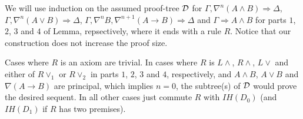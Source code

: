 We will use induction on the assumed proof-tree $\mathcal{D}$ for $\Gamma, \nabla^n (A \wedge B) \Rightarrow \Delta$, $\Gamma, \nabla^n (A \vee B) \Rightarrow \Delta$, $\Gamma, \nabla^n B, \nabla^{n+1} (A \rightarrow B) \Rightarrow \Delta$ and $\Gamma \Rightarrow A \wedge B$ for parts $1$, $2$, $3$ and $4$ of Lemma, repsectively, where it ends with a rule $R$. Notice that our construction does not increase the proof size.

Cases where $R$ is an axiom are trivial. In cases where $R$ is $L \wedge$, $R \wedge$, $L \vee$ and either of $R \vee_1$ or $R \vee_2$ in parts $1$, $2$, $3$ and $4$, respectively, and $A \wedge B$, $A \vee B$ and $\nabla (A \rightarrow B)$ are principal, which implies $n = 0$, the subtree(s) of $\mathcal{D}$ would prove the desired sequent. In all other cases just commute $R$ with $IH(D_0)$ (and $IH(D_1)$ if $R$ has two premises).